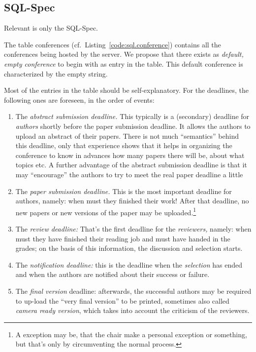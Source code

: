 \newpage


\subsection*{SQL-Spec}
\label{sec:sql}
\lstset{basicstyle=\scriptsize,numbers=left,numberstyle=\tiny,stepnumber=5,language=sql,frame=tb}

Relevant is only the SQL-Spec.



The table conferences (cf.\ Listing~\ref{code:sql.conference}) contains all
the conferences being hosted by the server. We propose that there exists as
\emph{default, empty conference} to begin with as entry in the table. This
default conference is characterized by the empty string. 


%

Most of the entries in the table should be self-explanatory.  For the
deadlines, the following ones are foreseen, in the order of events:
\begin{enumerate}
\item The \emph{abstract submission deadline.} This typically is a
  (secondary) deadline for \emph{authors} shortly before the paper
  submission deadline.  It allows the authors to upload an abstract of
  their papers. There is not much ``semantics'' behind this deadline, only
  that experience shows that it helps in organizing the conference to know
  in advances how many papers there will be, about what topics etc. A
  further advantage of the abstract submission deadline is that it may
  ``encourage'' the authors to try to meet the real paper deadline a little
\item The \emph{paper submission deadline.} This is the most important
  deadline for authors, namely: when must they finished their work! After
  that deadline, no new papers or new versions of the paper may be
  uploaded.\footnote{A exception may be, that the chair make a personal
    exception or something, but that's only by circumventing the normal
    process.}
\item The \emph{review deadline:} That's the first deadline for the
  \emph{reviewers,} namely: when must they have finished their reading job
  and must have handed in the grades; on the basis of this information, the
  discussion and selection starts.
\item The \emph{notification deadline:} this is the deadline when the
  \emph{selection} has ended and when the authors are notified about their
  success or failure.
\item The \emph{final version} deadline: afterwards, the successful authors
  may be required to up-load the ``very final version'' to be printed,
  sometimes also called \emph{camera ready version}, which takes into
  account the criticism of the reviewers.
\end{enumerate}


